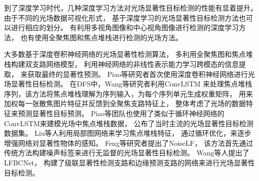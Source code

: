 到了深度学习时代，几种深度学习方法对光场显著性目标检测的性能有显着提升。
由于不同的光场数据可视化形式，
基于深度学习的光场显著性目标检测方法也可以进行相应的划分。
有利用多视角图像和中心视角图像进行检测的深度学习方法，
也有使用全聚焦图和焦点堆栈进行检测的光场方法。



大多数基于深度卷积神经网络的光场显著性检测算法，
多利用全聚焦图和焦点堆栈构建双支路网络模型，
利用神经网络的非线性表示能力学习跨模态的信息提取，
来获取最终的显著性预测。
Piao等研究者首次使用深度卷积神经网络进行光场显著性目标检测。
在DFS中，Wang等研究者利用ConvLSTM
来处理焦点堆栈序列，该方法将焦点堆栈理解为序列输入，为每个序列单元生成权重矩阵，
用来加权每一张散焦图片特征并反馈到全聚焦支路特征上，
整体考虑了光场的数据特征来预测显著性目标预测。
Piao等团队也使用了类似于循环神经网络的ConvLSTM来建模光场中焦点堆栈数据，
公布了当时主流的光场显著性目标检测数据集。
Liu等人利用局部图网络来学习焦点堆栈特征，
通过循环优化，来逐步增强网络对显著性物体的感知。
Feng等研究者提出了NoiseLF，
该方法首先通过传统方法构建噪声标签来进行无监督的光场显著性目标检测。
Wang等人提出了LFBCNet，
构建了级联显著性检测支路和边缘预测支路的网络来进行光场显著性目标检测。








